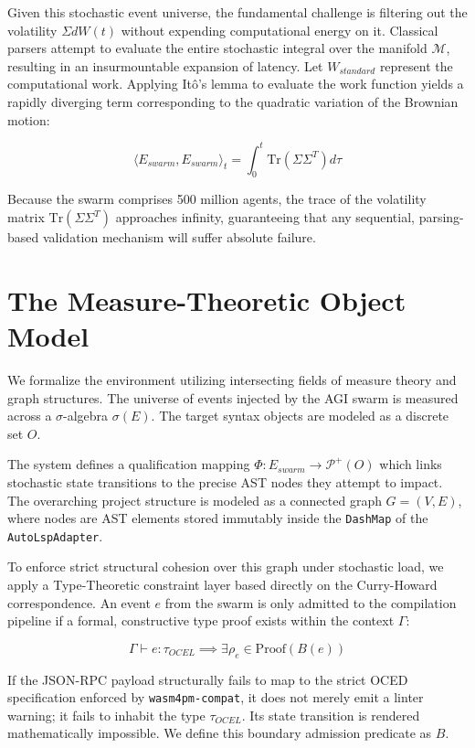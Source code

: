 Given this stochastic event universe, the fundamental challenge is filtering out the volatility $\Sigma dW(t)$ without expending computational energy on it. Classical parsers attempt to evaluate the entire stochastic integral over the manifold $\mathcal{M}$, resulting in an insurmountable expansion of latency. Let $W_{standard}$ represent the computational work. Applying Itô's lemma to evaluate the work function yields a rapidly diverging term corresponding to the quadratic variation of the Brownian motion:

\begin{equation}
\langle E_{swarm}, E_{swarm} \rangle_t = \int_0^t \text{Tr}(\Sigma \Sigma^T) d\tau
\end{equation}

Because the swarm comprises 500 million agents, the trace of the volatility matrix $\text{Tr}(\Sigma \Sigma^T)$ approaches infinity, guaranteeing that any sequential, parsing-based validation mechanism will suffer absolute failure.

\section{The Measure-Theoretic Object Model}

We formalize the environment utilizing intersecting fields of measure theory and graph structures. The universe of events injected by the AGI swarm is measured across a $\sigma$-algebra $\sigma(E)$. The target syntax objects are modeled as a discrete set $O$. 

The system defines a qualification mapping $\Phi : E_{swarm} \to \mathcal{P}^+(O)$ which links stochastic state transitions to the precise AST nodes they attempt to impact. The overarching project structure is modeled as a connected graph $G = (V,E)$, where nodes are AST elements stored immutably inside the \texttt{DashMap} of the \texttt{AutoLspAdapter}.

To enforce strict structural cohesion over this graph under stochastic load, we apply a Type-Theoretic constraint layer based directly on the Curry-Howard correspondence. An event $e$ from the swarm is only admitted to the compilation pipeline if a formal, constructive type proof exists within the context $\Gamma$:

\begin{equation}
\Gamma \vdash e : \tau_{OCEL} \implies \exists \rho_e \in \text{Proof}(B(e))
\end{equation}

If the JSON-RPC payload structurally fails to map to the strict OCED specification enforced by \texttt{wasm4pm-compat}, it does not merely emit a linter warning; it fails to inhabit the type $\tau_{OCEL}$. Its state transition is rendered mathematically impossible. We define this boundary admission predicate as $B$.

